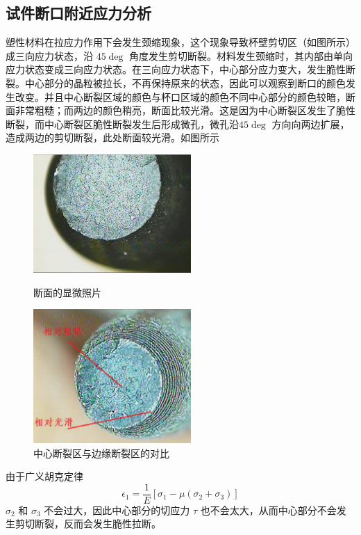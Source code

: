 \documentclass[12pt, a4paper]{ctexart}
\begin{document}
\subsection{试件断口附近应力分析}
塑性材料在拉应力作用下会发生颈缩现象，这个现象导致杯壁剪切区（如图所示） 成三向应力状态，沿 $ 45\deg $ 角度发生剪切断裂。材料发生颈缩时，其内部由单向应力状态变成三向应力状态。在三向应力状态下，中心部分应力变大，发生脆性断裂。中心部分的晶粒被拉长，不再保持原来的状态，因此可以观察到断口的颜色发生改变。并且中心断裂区域的颜色与杯口区域的颜色不同中心部分的颜色较暗，断面非常粗糙；而两边的颜色稍亮，断面比较光滑。这是因为中心断裂区发生了脆性断裂，而中心断裂区脆性断裂发生后形成微孔，微孔沿$ 45\deg $ 方向向两边扩展，造成两边的剪切断裂，此处断面较光滑。如图所示
\begin{figure}[htbp]
	\centering
	\begin{minipage}[t]{0.48\textwidth}
		\centering
		\includegraphics[width=6cm]{43.jpg}
		\caption{断面的显微照片}
	\end{minipage}
	\begin{minipage}[t]{0.48\textwidth}
		\centering
		\includegraphics[width=6cm]{43.png}
		\caption{中心断裂区与边缘断裂区的对比}
	\end{minipage}
\end{figure}

由于广义胡克定律
\begin{equation}
	\epsilon_1 =\frac{1}{E} \left[\sigma_1 - \mu (\sigma_2 + \sigma_3)\right]
\end{equation}
$ \sigma_2 $ 和 $ \sigma_3 $ 不会过大，因此中心部分的切应力 $ \tau $ 也不会太大，从而中心部分不会发生剪切断裂，反而会发生脆性拉断。
\end{document}

